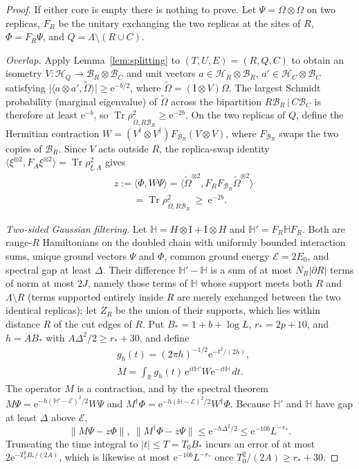 \documentclass[aps,prx,reprint,superscriptaddress,floatfix,nofootinbib,longbibliography,amsmath,amssymb]{revtex4-2}
\newcommand{\R}{\mathbb R}
\newcommand{\id}{\mathrm{I}}
\newcommand{\Tr}{\operatorname{Tr}}
\newcommand{\norm}[1]{\lVert #1\rVert}
\newcommand{\abs}[1]{\lvert #1\rvert}
\newcommand{\cH}{\mathcal H}
\newcommand{\cB}{\mathcal B}
\newcommand{\Om}{\Omega}
\newcommand{\Lam}{\Lambda}
\newcommand{\e}{\mathrm e}
\theoremstyle{plain}
\theoremstyle{definition}
\begin{document}
\begin{proof}
If either core is empty there is nothing to prove. Let $\Psi=\Om\otimes\Om$ on
two replicas, $F_R$ be the unitary exchanging the two replicas at the sites
of $R$, $\Phi=F_R\Psi$, and $Q=\Lam\setminus(R\cup C)$.

\emph{Overlap.} Apply Lemma~\ref{lem:splitting} to $(T,U,E)=(R,Q,C)$ to obtain an
isometry $V:\cH_Q\to\cB_R\otimes\cB_C$ and unit vectors $a\in\cH_R\otimes\cB_R$,
$a'\in\cH_C\otimes\cB_C$ satisfying
$\abs{\langle a\otimes a',\widetilde\Om\rangle}\ge\e^{-b/2}$, where
$\widetilde\Om=(\id\otimes V)\Om$. The largest Schmidt probability (marginal eigenvalue) of
$\widetilde\Om$ across the bipartition $R\cB_R\,|\,C\cB_C$ is therefore at least $\e^{-b}$,
so $\Tr\rho_{\widetilde\Om,R\cB_R}^2\ge\e^{-2b}$. On the two
replicas of $Q$, define the Hermitian contraction
$W=(V^\dagger\otimes V^\dagger)F_{\cB_R}(V\otimes V)$, where $F_{\cB_R}$ swaps
the two copies of $\cB_R$. Since $V$ acts outside $R$, the replica-swap identity
$\langle\xi^{\otimes2},F_{A}\xi^{\otimes2}\rangle=\Tr\rho_{\xi,A}^2$ gives
\begin{equation}\label{eq:zoverlap}
\begin{split}
 &z:=\langle\Phi,W\Psi\rangle=\langle\widetilde\Om^{\otimes2},F_RF_{\cB_R}\widetilde\Om^{\otimes2}\rangle\\
 &\qquad=\Tr\rho_{\widetilde\Om,R\cB_R}^2\ \ge\ \e^{-2b}.
\end{split}
\end{equation}

\emph{Two-sided Gaussian filtering.} Let $\mathbb H=H\otimes\id+\id\otimes H$
and $\mathbb H'=F_R\mathbb HF_R$. Both are range-$R$ Hamiltonians on the
doubled chain with uniformly bounded interaction sums, unique ground
vectors $\Psi$ and $\Phi$, common ground energy $\mathcal E=2E_0$, and spectral gap at
least $\Delta$. Their difference $\mathbb H'-\mathbb H$ is a sum of at most $N_R\abs{\partial R}$
terms of norm at most $2J$, namely those terms of $\mathbb H$ whose support meets both $R$
and $\Lam\setminus R$ (terms supported entirely inside $R$ are merely exchanged between the
two identical replicas); let $Z_R$ be the union of their supports, which lies
within distance $R$ of the cut edges of $R$. Put
$B_*=1+b+\log L$, $r_*=2p+10$, and $h=AB_*$ with $A\Delta^2/2\ge r_*+30$, and define
\[
\begin{split}
 &g_h(t)=(2\pi h)^{-1/2}\e^{-t^2/(2h)},\\
 &M=\int_{\R}g_h(t)\,\e^{it\mathbb H'}W\e^{-it\mathbb H}\,dt .
\end{split}
\]
The operator $M$ is a contraction, and by the spectral theorem
$M\Psi=\e^{-h(\mathbb H'-\mathcal E)^2/2}W\Psi$ and $M^\dagger\Phi=\e^{-h(\mathbb H-\mathcal E)^2/2}W^\dagger\Phi$.
Because $\mathbb H'$ and $\mathbb H$ have gap at least $\Delta$ above $\mathcal E$,
\begin{equation}\label{eq:twosided}
 \norm{M\Psi-z\Phi},\ \norm{M^\dagger\Phi-z\Psi}\le\e^{-h\Delta^2/2}\le\e^{-10b}L^{-r_*}.
\end{equation}
Truncating the time integral to $\abs t\le T=T_0B_*$ incurs an error of at most
$2\e^{-T_0^2B_*/(2A)}$, which is likewise at most $\e^{-10b}L^{-r_*}$ once
$T_0^2/(2A)\ge r_*+30$.


\end{proof}
\end{document}
